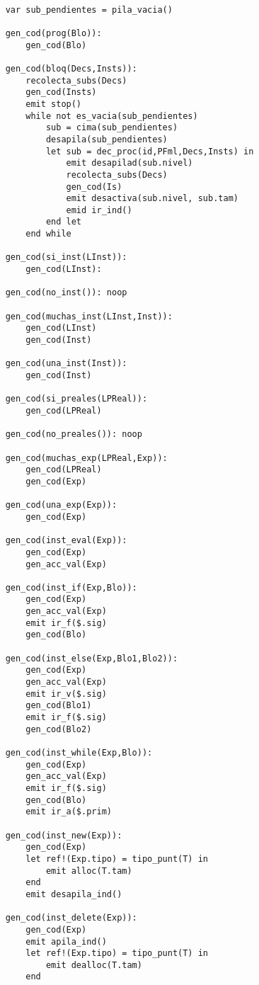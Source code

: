 \begin{lstlisting}

    var sub_pendientes = pila_vacia()

    gen_cod(prog(Blo)):
        gen_cod(Blo)

    gen_cod(bloq(Decs,Insts)):
        recolecta_subs(Decs)
        gen_cod(Insts)
        emit stop()
        while not es_vacia(sub_pendientes)
            sub = cima(sub_pendientes)
            desapila(sub_pendientes)
            let sub = dec_proc(id,PFml,Decs,Insts) in
                emit desapilad(sub.nivel)
                recolecta_subs(Decs)
                gen_cod(Is)
                emit desactiva(sub.nivel, sub.tam)
                emid ir_ind()
            end let
        end while

    gen_cod(si_inst(LInst)):
        gen_cod(LInst):

    gen_cod(no_inst()): noop

    gen_cod(muchas_inst(LInst,Inst)):
        gen_cod(LInst)
        gen_cod(Inst)

    gen_cod(una_inst(Inst)):
        gen_cod(Inst)

    gen_cod(si_preales(LPReal)):
        gen_cod(LPReal)

    gen_cod(no_preales()): noop

    gen_cod(muchas_exp(LPReal,Exp)):
        gen_cod(LPReal)
        gen_cod(Exp)

    gen_cod(una_exp(Exp)):
        gen_cod(Exp)

    gen_cod(inst_eval(Exp)):
        gen_cod(Exp)
        gen_acc_val(Exp)

    gen_cod(inst_if(Exp,Blo)):
        gen_cod(Exp)
        gen_acc_val(Exp)
        emit ir_f($.sig)
        gen_cod(Blo)

    gen_cod(inst_else(Exp,Blo1,Blo2)):
        gen_cod(Exp)
        gen_acc_val(Exp)
        emit ir_v($.sig)
        gen_cod(Blo1)
        emit ir_f($.sig)
        gen_cod(Blo2)

    gen_cod(inst_while(Exp,Blo)):
        gen_cod(Exp)
        gen_acc_val(Exp)
        emit ir_f($.sig)
        gen_cod(Blo)
        emit ir_a($.prim)

    gen_cod(inst_new(Exp)):
        gen_cod(Exp)
        let ref!(Exp.tipo) = tipo_punt(T) in
            emit alloc(T.tam)
        end
        emit desapila_ind()

    gen_cod(inst_delete(Exp)):
        gen_cod(Exp)
        emit apila_ind()
        let ref!(Exp.tipo) = tipo_punt(T) in
            emit dealloc(T.tam)
        end


\end{lstlisting}
